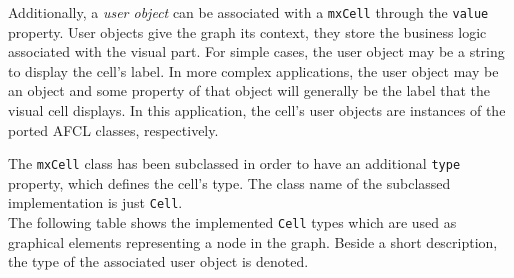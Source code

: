 \documentclass[a4paper,12pt,pdftex,halfparskip,cleardoubleempty,bibtotoc,liststotoc]{scrbook}
\begin{document}
Additionally, a \textit{user object} can be associated with a \texttt{mxCell} through the \texttt{value} property. User objects give the graph its context, they store the business logic associated with the visual part. \cite{manuals-mxgraph-user-manual} For simple cases, the user object may be a string to display the cell's label. In more complex applications, the user object may be an object and some property of that object will generally be the label that the visual cell displays. In this application, the cell's user objects are instances of the ported AFCL classes, respectively.

The \texttt{mxCell} class has been subclassed in order to have an additional \texttt{type} property, which defines the cell's type. The class name of the subclassed implementation is just \texttt{Cell}.\\
The following table shows the implemented \texttt{Cell} types which are used as graphical elements representing a node in the graph. Beside a short description, the type of the associated user object is denoted.
\end{document}
